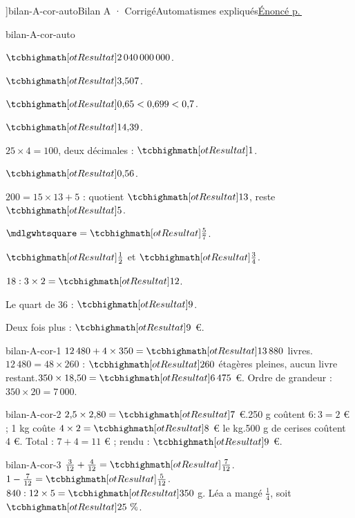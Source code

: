 \editionPage[\pdfbookmark[0]{Corrigés des bilans}{bm-bilan-A-cor-auto-parent}]{bilan-A-cor-auto}{Bilan A · Corrigé}{Automatismes expliqués}{\hyperref[bilan-A-auto]{Énoncé p.\,\pageref*{bilan-A-auto}}}
\begin{blocEdition}{bilan-A-cor-auto}
\begin{questions}
\item $\res{2\,040\,000\,000}$.
\item $\res{3{,}507}$.
\item $\res{0{,}65<0{,}699<0{,}7}$.
\item $\res{14{,}39}$.
\item $25\times4=100$, deux décimales : $\res1$.
\item $\res{0{,}56}$.
\item $200=15\times13+5$ : quotient $\res{13}$, reste $\res5$.
\item $\square=\res{\frac57}$.
\item $\res{\frac12}$ et $\res{\frac34}$.
\item $18:3\times2=\res{12}$.
\item Le quart de 36 : $\res9$.
\item Deux fois plus : $\res9$ €.\end{questions}
\end{blocEdition}
\begin{blocEdition}{bilan-A-cor-1}
$12\,480+4\times350=\res{13\,880}$ livres.$12\,480=48\times260$ : $\res{260}$ étagères pleines, aucun livre restant.$350\times18{,}50=\res{6\,475}$ €. Ordre de grandeur : $350\times20=7\,000$.
\end{blocEdition}
\begin{blocEdition}{bilan-A-cor-2}
$2{,}5\times2{,}80=\res7$ €.250 g coûtent $6:3=2$ € ; 1 kg coûte $4\times2=\res8$ € le kg.500 g de cerises coûtent 4 €. Total : $7+4=11$ € ; rendu : $\res9$ €.
\end{blocEdition}
\begin{blocEdition}{bilan-A-cor-3}
$\frac3{12}+\frac4{12}=\res{\frac7{12}}$.$1-\frac7{12}=\res{\frac5{12}}$.$840:12\times5=\res{350}$ g. Léa a mangé $\frac14$, soit $\res{25\text{~\%}}$.
\end{blocEdition}
